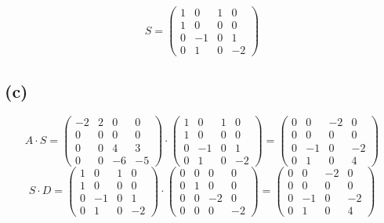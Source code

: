 \documentclass{article} %
\begin{document}
\[
S =  \begin{pmatrix}
         1&0&1&0\\
         1&0&0&0 \\
         0&-1&0&1 \\
         0&1&0&-2
      \end{pmatrix}
\]

\subsection*{(c)}
\[
A \cdot S = \begin{pmatrix}
    -2 & 2 & 0 & 0 \\ 
    0 & 0 & 0 & 0 \\
    0 & 0 & 4 & 3 \\ 
    0 & 0 & -6 & -5
    \end{pmatrix} \cdot   \begin{pmatrix}
        1&0&1&0\\
         1&0&0&0 \\
         0&-1&0&1 \\
         0&1&0&-2
      \end{pmatrix} = 
      \begin{pmatrix}
   0&0&-2&0\\
           0&0&0&0\\
           0&-1&0&-2\\
           0&1&0&4
      \end{pmatrix}
\]
\[
S \cdot D =  \begin{pmatrix}
       1&0&1&0\\
         1&0&0&0 \\
         0&-1&0&1 \\
         0&1&0&-2
      \end{pmatrix} \cdot  
      \begin{pmatrix}
        0 & 0 & 0 & 0 \\
0 & 1 & 0 & 0 \\
0 & 0 & -2 & 0 \\
0 & 0 & 0 & -2
      \end{pmatrix} = 
     \begin{pmatrix}
  0&0&-2&0\\
           0&0&0&0\\
           0&-1&0&-2\\
           0&1&0&4
\end{pmatrix}
\]
     
\end{document}
